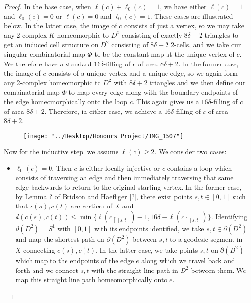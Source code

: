 \documentclass[12pt]{article}
\newcommand{\vs}{\vskip10pt}
\begin{document}
\begin{proof}
		In the base case, when $\ell(c) + \ell_0(c) = 1$, we have either $\ell(c) = 1$ and $\ell_0(c) = 0$ or $\ell(c) = 0$ and $\ell_0(c) = 1$. These cases are illustrated below. In the latter case, the image of $c$ consists of just a vertex, so we may take any 2-complex $K$ homeomorphic to $D^2$ consisting of exactly $8 \delta + 2$ triangles to get an induced cell structure on $D^2$ consisting of $8 \delta + 2$ 2-cells, and we take our singular combinatorial map $\Phi$ to be the constant map at the unique vertex of $c$. We therefore have a standard $16 \delta$-filling of $c$ of area $8 \delta + 2$. In the former case, the image of $c$ consists of a unique vertex and a unique edge, so we again form any 2-complex homeomorphic to $D^2$ with $8 \delta + 2$ triangles and we then define our combinatorial map $\Phi$ to map every edge along with the boundary endpoints of the edge homeomorphically onto the loop $c$. This again gives us a $16 \delta$-filling of $c$ of area $8 \delta + 2$. Therefore, in either case, we achieve a $16 \delta$-filling of $c$ of area $8 \delta + 2$. 
		
\begin{figure} [h]
	\centering
	\texttt{[image: "../Desktop/Honours Project/IMG\_1507"]}
	\caption{}
	\label{fig:img1507}
\end{figure}
		\vs 
		
		Now for the inductive step, we assume $\ell(c) \geq 2$. We consider two cases: 
		
		\begin{itemize}
			\item $\ell_0(c) = 0$. Then $c$ is either locally injective or $c$ contains a loop which consists of traversing an edge and then immediately traversing that same edge backwards to return to the original starting vertex. In the former case, by Lemma ? of Bridson and Haefliger [?], there exist points $s,t \in [0,1]$ such that $c(s), c(t)$ are vertices of $X$ and $d(c(s), c(t)) \leq \min \{\ell(c_{\restriction [s,t]}) - 1, 16 \delta - \ell(c_{\restriction [s,t]})\}$. Identifying $\partial (D^2) = S^1$ with $[0,1]$ with its endpoints identified, we take $s,t \in \partial(D^2)$ and map the shortest path on $\partial(D^2)$ between $s,t$ to a geodesic segment in $X$ connecting $c(s), c(t)$. In the latter case, we take points $s,t$ on $\partial(D^2)$ which map to the endpoints of the edge $e$ along which we travel back and forth and we connect $s,t$ with the straight line path in $D^2$ between them. We map this straight line path homeomorphically onto $e$. 
			

\end{itemize}
\end{proof}
\end{document}
